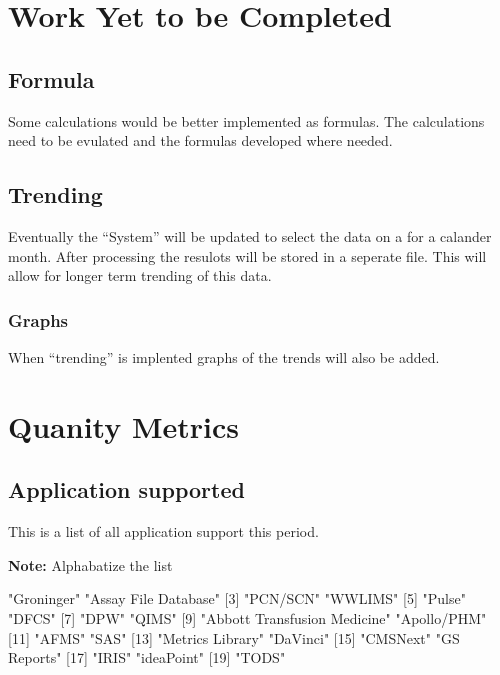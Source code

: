 \documentclass{article}
\begin{document}
\section{Work Yet to be Completed}
\subsection{Formula}
Some calculations would be better implemented as formulas. The calculations need
to be evulated and the formulas developed where needed.
\subsection{Trending}
Eventually the ``System'' will be updated to select the data on a for a calander
month. After processing the resulots will be stored in a seperate file.
This will allow for longer term trending of this data.
\subsubsection{Graphs}
When ``trending'' is implented graphs of the trends will also be added.


\section{Quanity Metrics}
\subsection{Application supported}
This is a list of all application support this period.

\textbf{Note:} Alphabatize the list

\begin{Schunk}
\begin{Soutput}
 [1] "Groninger"                   "Assay File Database"        
 [3] "PCN/SCN"                     "WWLIMS"                     
 [5] "Pulse"                       "DFCS"                       
 [7] "DPW"                         "QIMS"                       
 [9] "Abbott Transfusion Medicine" "Apollo/PHM"                 
[11] "AFMS"                        "SAS"                        
[13] "Metrics Library"             "DaVinci"                    
[15] "CMSNext"                     "GS Reports"                 
[17] "IRIS"                        "ideaPoint"                  
[19] "TODS"                       
\end{Soutput}
\end{Schunk}
\end{document}
